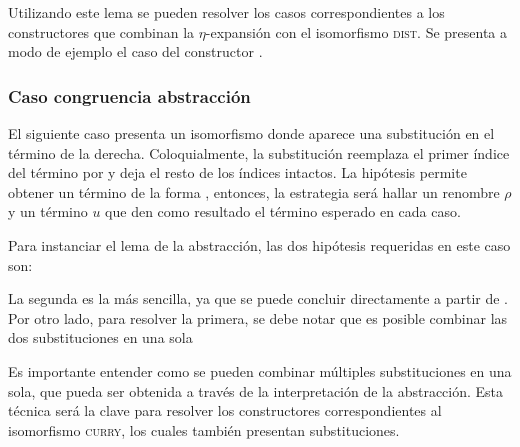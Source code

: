 
Utilizando este lema se pueden resolver los casos correspondientes a los constructores que combinan la $\eta$-expansión con el isomorfismo \textsc{dist}.
Se presenta a modo de ejemplo el caso del constructor .


\subsubsection{Caso congruencia abstracción}

El siguiente caso presenta un isomorfismo donde aparece una substitución en el término de la derecha.
Coloquialmente, la substitución  reemplaza el primer índice del término por
\const{[}  \const{]≡} 
y deja el resto de los índices intactos.
La hipótesis  permite obtener un término de la forma
\snstar
{}
, entonces, la estrategia será hallar un renombre $\rho$ y un término $u$ que den como resultado el término esperado en cada caso.

Para instanciar el lema de la abstracción, las dos hipótesis requeridas en este caso son:

\vspace{1em}
\snstar
{}

\snstar
\subst
{\cons
	{\const{[}  \const{]≡} }
	{}}
{}
\vspace{1em}

La segunda es la más sencilla, ya que se puede concluir directamente a partir de .
Por otro lado, para resolver la primera, se debe notar que es posible combinar las dos substituciones en una sola 
\subst
{\cons
	{\const{[}  \const{]≡} }
	{\parens{\comp{\ids}{\bound{$\rho$}}}}}
{}


Es importante entender como se pueden combinar múltiples substituciones en una sola, que pueda ser obtenida a través de la interpretación de la abstracción.
Esta técnica será la clave para resolver los constructores correspondientes al isomorfismo \textsc{curry}, los cuales también presentan substituciones.

